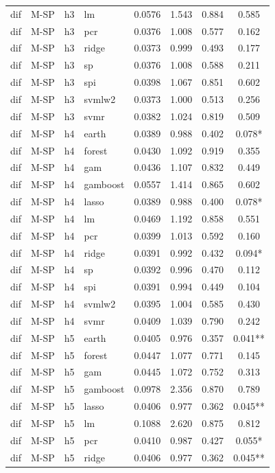 \begin{ThreePartTable}
\begin{longtable}[t]{llclcccc}
dif & M-SP & h3 & lm & 0.0576 & 1.543 & 0.884 & 0.585\\
dif & M-SP & h3 & pcr & 0.0376 & 1.008 & 0.577 & 0.162\\
dif & M-SP & h3 & ridge & 0.0373 & 0.999 & 0.493 & 0.177\\
dif & M-SP & h3 & sp & 0.0376 & 1.008 & 0.588 & 0.211\\
dif & M-SP & h3 & spi & 0.0398 & 1.067 & 0.851 & 0.602\\
dif & M-SP & h3 & svmlw2 & 0.0373 & 1.000 & 0.513 & 0.256\\
dif & M-SP & h3 & svmr & 0.0382 & 1.024 & 0.819 & 0.509\\
\addlinespace
dif & M-SP & h4 & earth & 0.0389 & 0.988 & 0.402 & 0.078*\\
dif & M-SP & h4 & forest & 0.0430 & 1.092 & 0.919 & 0.355\\
dif & M-SP & h4 & gam & 0.0436 & 1.107 & 0.832 & 0.449\\
dif & M-SP & h4 & gamboost & 0.0557 & 1.414 & 0.865 & 0.602\\
dif & M-SP & h4 & lasso & 0.0389 & 0.988 & 0.400 & 0.078*\\
dif & M-SP & h4 & lm & 0.0469 & 1.192 & 0.858 & 0.551\\
dif & M-SP & h4 & pcr & 0.0399 & 1.013 & 0.592 & 0.160\\
dif & M-SP & h4 & ridge & 0.0391 & 0.992 & 0.432 & 0.094*\\
dif & M-SP & h4 & sp & 0.0392 & 0.996 & 0.470 & 0.112\\
dif & M-SP & h4 & spi & 0.0391 & 0.994 & 0.449 & 0.104\\
dif & M-SP & h4 & svmlw2 & 0.0395 & 1.004 & 0.585 & 0.430\\
dif & M-SP & h4 & svmr & 0.0409 & 1.039 & 0.790 & 0.242\\
\addlinespace
dif & M-SP & h5 & earth & 0.0405 & 0.976 & 0.357 & 0.041**\\
dif & M-SP & h5 & forest & 0.0447 & 1.077 & 0.771 & 0.145\\
dif & M-SP & h5 & gam & 0.0445 & 1.072 & 0.752 & 0.313\\
dif & M-SP & h5 & gamboost & 0.0978 & 2.356 & 0.870 & 0.789\\
dif & M-SP & h5 & lasso & 0.0406 & 0.977 & 0.362 & 0.045**\\
dif & M-SP & h5 & lm & 0.1088 & 2.620 & 0.875 & 0.812\\
dif & M-SP & h5 & pcr & 0.0410 & 0.987 & 0.427 & 0.055*\\
dif & M-SP & h5 & ridge & 0.0406 & 0.977 & 0.362 & 0.045**\\

\end{longtable}
\end{ThreePartTable}

